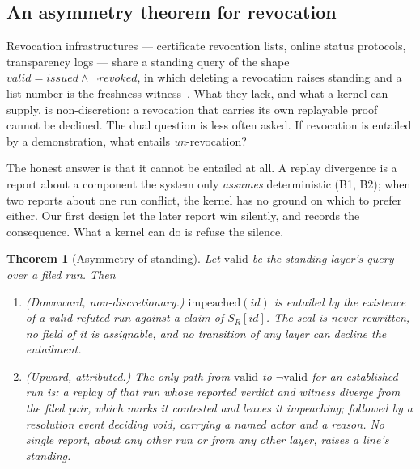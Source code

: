 \documentclass[11pt,a4paper]{article}
\theoremstyle{plain}
\newtheorem{theorem}{Theorem}
\theoremstyle{definition}
\theoremstyle{remark}
\newcommand{\SR}{\ensuremath{S_R}}
\begin{document}
\subsection{An asymmetry theorem for revocation}
\label{sec:asymmetry}

Revocation infrastructures --- certificate revocation lists, online status protocols, transparency logs --- share a standing query of the shape $\mathit{valid} = \mathit{issued} \wedge \neg\mathit{revoked}$, in which deleting a revocation raises standing and a list number is the freshness witness~\cite{rfc5280,kocher,laurie}. What they lack, and what a kernel can supply, is non-discretion: a revocation that carries its own replayable proof cannot be declined. The dual question is less often asked. If revocation is entailed by a demonstration, what entails \emph{un}-revocation?

The honest answer is that it cannot be entailed at all. A replay divergence is a report about a component the system only \emph{assumes} deterministic (B1, B2); when two reports about one run conflict, the kernel has no ground on which to prefer either. Our first design let the later report win silently, and  records the consequence. What a kernel can do is refuse the silence.

\begin{theorem}[Asymmetry of standing]
\label{thm:asym}
Let $\mathrm{valid}$ be the standing layer's query over a filed run. Then
\begin{enumerate}[leftmargin=*,itemsep=1pt]
  \item \emph{(Downward, non-discretionary.)} $\mathrm{impeached}(\mathit{id})$ is entailed by the existence of a valid refuted run against a claim of $\SR[\mathit{id}]$. The seal is never rewritten, no field of it is assignable, and no transition of any layer can decline the entailment.
  \item \emph{(Upward, attributed.)} The only path from $\mathrm{valid}$ to $\neg\mathrm{valid}$ for an \emph{established} run is: a replay of \emph{that} run whose reported verdict and witness diverge from the filed pair, which marks it contested and leaves it impeaching; followed by a resolution event deciding \emph{void}, carrying a named actor and a reason. No single report, about any other run or from any other layer, raises a line's standing.
\end{enumerate}
\end{theorem}
\end{document}
